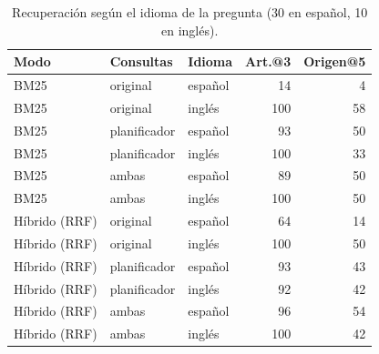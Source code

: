 \begin{table}[htbp]
\centering
\small
\caption{Recuperación según el idioma de la pregunta (30 en español, 10 en inglés).}
\label{tab:idioma}
\begin{tabular}{lllrr}
\toprule
\textbf{Modo} & \textbf{Consultas} & \textbf{Idioma} & \textbf{Art.@3} & \textbf{Origen@5} \\
\midrule
BM25 & original & español & 14 & 4 \\
BM25 & original & inglés & 100 & 58 \\
BM25 & planificador & español & 93 & 50 \\
BM25 & planificador & inglés & 100 & 33 \\
BM25 & ambas & español & 89 & 50 \\
BM25 & ambas & inglés & 100 & 50 \\
Híbrido (RRF) & original & español & 64 & 14 \\
Híbrido (RRF) & original & inglés & 100 & 50 \\
Híbrido (RRF) & planificador & español & 93 & 43 \\
Híbrido (RRF) & planificador & inglés & 92 & 42 \\
Híbrido (RRF) & ambas & español & 96 & 54 \\
Híbrido (RRF) & ambas & inglés & 100 & 42 \\
\bottomrule
\end{tabular}
\end{table}
